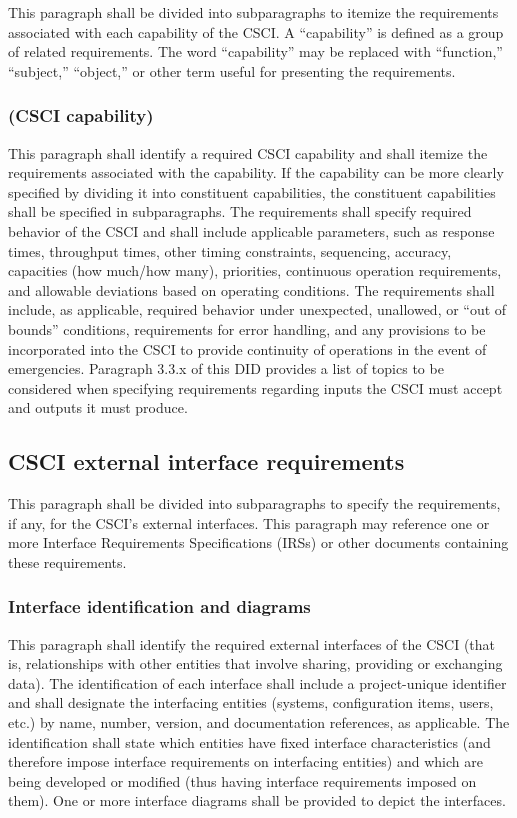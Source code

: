 This paragraph shall be divided into subparagraphs to itemize the
requirements associated with each capability of the CSCI. A
``capability'' is defined as a group of related requirements. The word
``capability'' may be replaced with ``function,'' ``subject,''
``object,'' or other term useful for presenting the requirements.

\subsubsection{(CSCI capability)}

This paragraph shall identify a required CSCI capability and shall
itemize the requirements associated with the capability. If the
capability can be more clearly specified by dividing it into constituent
capabilities, the constituent capabilities shall be specified in
subparagraphs. The requirements shall specify required behavior of the
CSCI and shall include applicable parameters, such as response times,
throughput times, other timing constraints, sequencing, accuracy,
capacities (how much/how many), priorities, continuous operation
requirements, and allowable deviations based on operating conditions.
The requirements shall include, as applicable, required behavior under
unexpected, unallowed, or ``out of bounds'' conditions, requirements for
error handling, and any provisions to be incorporated into the CSCI to
provide continuity of operations in the event of emergencies. Paragraph
3.3.x of this DID provides a list of topics to be considered when
specifying requirements regarding inputs the CSCI must accept and
outputs it must produce.

\subsection{CSCI external interface requirements}

This paragraph shall be divided into subparagraphs to specify the
requirements, if any, for the CSCI's external interfaces. This paragraph
may reference one or more Interface Requirements Specifications (IRSs)
or other documents containing these requirements.

\subsubsection{Interface identification and diagrams}

This paragraph shall identify the required external interfaces of the
CSCI (that is, relationships with other entities that involve sharing,
providing or exchanging data). The identification of each interface
shall include a project-unique identifier and shall designate the
interfacing entities (systems, configuration items, users, etc.) by
name, number, version, and documentation references, as applicable. The
identification shall state which entities have fixed interface
characteristics (and therefore impose interface requirements on
interfacing entities) and which are being developed or modified (thus
having interface requirements imposed on them). One or more interface
diagrams shall be provided to depict the interfaces.

